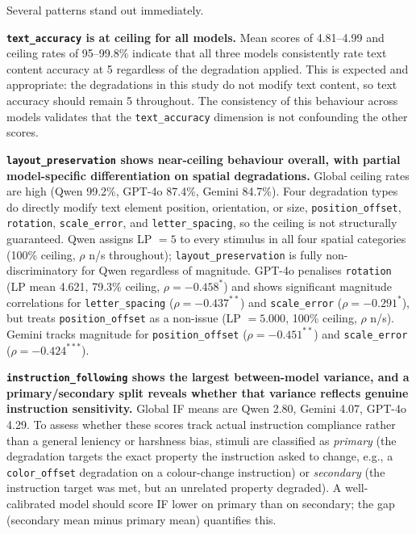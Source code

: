 Several patterns stand out immediately.

\textbf{\texttt{text\_accuracy} is at ceiling for all models.} Mean scores of 4.81--4.99 and ceiling rates of 95--99.8\% indicate that all three models consistently rate text content accuracy at 5 regardless of the degradation applied. This is expected and appropriate: the degradations in this study do not modify text content, so text accuracy should remain 5 throughout. The consistency of this behaviour across models validates that the \texttt{text\_accuracy} dimension is not confounding the other scores.

\textbf{\texttt{layout\_preservation} shows near-ceiling behaviour overall, with partial model-specific differentiation on spatial degradations.} Global ceiling rates are high (Qwen 99.2\%, GPT-4o 87.4\%, Gemini 84.7\%). Four degradation types do directly modify text element position, orientation, or size, \texttt{position\_offset}, \texttt{rotation}, \texttt{scale\_error}, and \texttt{letter\_spacing}, so the ceiling is not structurally guaranteed. Qwen assigns LP $= 5$ to every stimulus in all four spatial categories (100\% ceiling, $\rho$ n/s throughout); \texttt{layout\_preservation} is fully non-discriminatory for Qwen regardless of magnitude. GPT-4o penalises \texttt{rotation} (LP mean 4.621, 79.3\% ceiling, $\rho = -0.458^*$) and shows significant magnitude correlations for \texttt{letter\_spacing} ($\rho = -0.437^{**}$) and \texttt{scale\_error} ($\rho = -0.291^*$), but treats \texttt{position\_offset} as a non-issue (LP $= 5.000$, 100\% ceiling, $\rho$ n/s). Gemini tracks magnitude for \texttt{position\_offset} ($\rho = -0.451^{**}$) and \texttt{scale\_error} ($\rho = -0.424^{***}$).

\textbf{\texttt{instruction\_following} shows the largest between-model variance, and a primary/secondary split reveals whether that variance reflects genuine instruction sensitivity.} Global IF means are Qwen 2.80, Gemini 4.07, GPT-4o 4.29. To assess whether these scores track actual instruction compliance rather than a general leniency or harshness bias, stimuli are classified as \textit{primary} (the degradation targets the exact property the instruction asked to change, e.g., a \texttt{color\_offset} degradation on a colour-change instruction) or \textit{secondary} (the instruction target was met, but an unrelated property degraded). A well-calibrated model should score IF lower on primary than on secondary; the gap (secondary mean minus primary mean) quantifies this.

